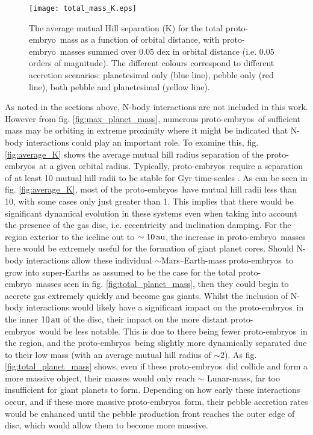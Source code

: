 \documentclass[a4paper,fleqn,usenatbib]{mnras}
\newcommand{\au}{{\, {\rm au}}}
\newcommand{\emb}{{{proto-embryo~}}}
\newcommand{\embs}{{{proto-embryos~}}}
\begin{document}
\begin{figure}
\centering
\texttt{[image: total\_mass\_K.eps]}
\caption{The average mutual Hill separation (K) for the total \emb mass as a function of orbital distance, with \emb masses summed over 0.05 dex in orbital distance (i.e. 0.05 orders of magnitude). The different colours correspond to different accretion scenarios: planetesimal only (blue line), pebble only (red line), both pebble and planetesimal (yellow line).}
\label{fig:total_mass_K}
\end{figure}

As noted in the sections above, N-body interactions are not included in this work.
However from fig. \ref{fig:max_planet_mass}, numerous \embs of sufficient mass may be orbiting in extreme proximity where it might be indicated that N-body interactions could play an important role.
To examine this, fig. \ref{fig:average_K} shows the average mutual hill radius separation of the \embs at a given orbital radius.
Typically, \embs require a separation of at least 10 mutual hill radii to be stable for Gyr time-scales \citep{PuWu2015}.
As can be seen in fig. \ref{fig:average_K}, most of the \embs have mutual hill radii less than 10, with some cases only just greater than 1.
This implies that there would be significant dynamical evolution in these systems even when taking into account the presence of the gas disc, i.e. eccentricity and inclination damping.
For the region exterior to the iceline out to $\sim 10 \au$, the increase in \emb masses here would be extremely useful for the formation of giant planet cores.
Should N-body interactions allow these individual $\sim$Mars--Earth-mass \embs to grow into super-Earths as assumed to be the case for the total \emb masses seen in fig. \ref{fig:total_planet_mass}, then they could begin to accrete gas extremely quickly and become gas giants.
Whilst the inclusion of N-body interactions would likely have a significant impact on the \embs in the inner $10 \au$ of the disc, their impact on the more distant \embs would be less notable.
This is due to there being fewer \embs in the region, and the \embs being slightly more dynamically separated due to their low mass (with an average mutual hill radius of $\sim 2$).
As fig. \ref{fig:total_planet_mass} shows, even if these \embs did collide and form a more massive object, their masses would only reach $\sim$ Lunar-mass, far too insufficient for giant planets to form.
Depending on how early these interactions occur, and if these more massive \embs form, their pebble accretion rates would be enhanced until the pebble production front reaches the outer edge of disc, which would allow them to become more massive.
\end{document}
